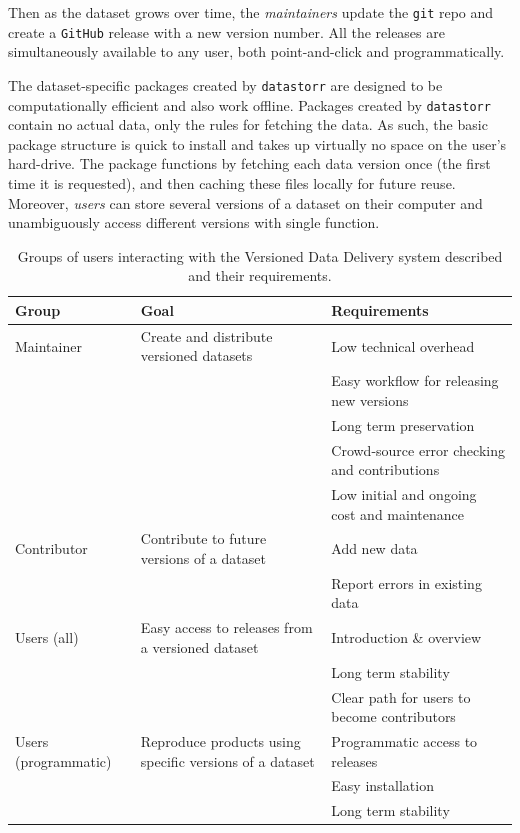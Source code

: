 \documentclass[a4paper,num-refs]{assets/oup-contemporary}
\begin{document}
Then as the dataset grows over time, the \emph{maintainers} update the \texttt{git} repo and create a \texttt{GitHub} release with a new version number. All the releases are simultaneously available to any user, both point-and-click and programmatically.

The dataset-specific packages created by \texttt{datastorr} are designed to be computationally efficient and also work offline. Packages created by \texttt{datastorr} contain no actual data, only the rules for fetching the data. As such, the basic package structure is quick to install and takes up virtually no space on the user's hard-drive. The package functions by fetching each data version once (the first time it is requested), and then caching these files locally for future reuse. Moreover, \emph{users} can store several versions of a dataset on their computer and unambiguously access different versions with single function.

\begin{table}[ht!]
\centering
\caption{Groups of users interacting with the Versioned Data Delivery system described and their requirements.}
\vspace{0.2cm}
  \begin{tabular}{p{3cm}p{7cm}p{6cm}}
  \hline
  \textbf{Group} & \textbf{Goal} & \textbf{Requirements} \\ \hline
  Maintainer & Create and distribute versioned datasets & Low technical overhead \\
    & & Easy workflow for releasing new versions \\
    & & Long term preservation \\
    & & Crowd-source error checking and contributions \\
    & & Low initial and ongoing cost and maintenance \\
  Contributor & Contribute to future versions of a dataset & Add new data \\
    & & Report errors in existing data \\
  Users (all) & Easy access to releases from a versioned dataset & Introduction \& overview \\
    & & Long term stability \\
    & & Clear path for users to become contributors \\
  Users (programmatic) & Reproduce products using specific versions of a dataset & Programmatic access to releases \\
    & & Easy installation \\
    & & Long term stability \\
  \hline
  \end{tabular}
\label{tab:user_requirements}
\end{table}
\end{document}
